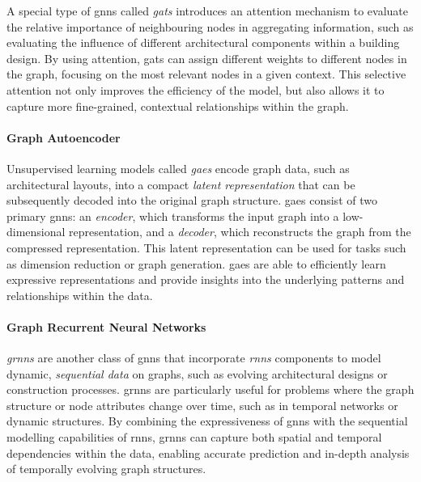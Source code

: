 \documentclass[a4paper, 12pt]{report}
\begin{document}
A special type of \acrshort{gnns} called \textit{\acrfull{gats}} introduces an attention mechanism to evaluate the relative importance of neighbouring nodes in aggregating information, such as evaluating the influence of different architectural components within a building design. By using attention, \acrshort{gats} can assign different weights to different nodes in the graph, focusing on the most relevant nodes in a given context. This selective attention not only improves the efficiency of the model, but also allows it to capture more fine-grained, contextual relationships within the graph.

\paragraph{Graph Autoencoder}\label{par:graph-autoencoder}

Unsupervised learning models called \textit{\acrfull{gaes}} encode graph data, such as architectural layouts, into a compact \textit{latent representation} that can be subsequently decoded into the original graph structure. \acrshort{gaes} consist of two primary \acrlong{gnns}: an \textit{encoder}, which transforms the input graph into a low-dimensional representation, and a \textit{decoder}, which reconstructs the graph from the compressed representation. This latent representation can be used for tasks such as dimension reduction or graph generation. \acrshort{gaes} are able to efficiently learn expressive representations and provide insights into the underlying patterns and relationships within the data.

\paragraph{Graph Recurrent Neural Networks}\label{par:graph-recurrent-neural-networks}

\textit{\acrfull{grnns}} are another class of \acrshort{gnns} that incorporate \textit{\acrfull{rnns}} components to model dynamic, \textit{sequential data} on graphs, such as evolving architectural designs or construction processes. \acrshort{grnns} are particularly useful for problems where the graph structure or node attributes change over time, such as in temporal networks or dynamic structures. By combining the expressiveness of \acrshort{gnns} with the sequential modelling capabilities of \acrshort{rnns}, \acrshort{grnns} can capture both spatial and temporal dependencies within the data, enabling accurate prediction and in-depth analysis of temporally evolving graph structures.
\end{document}
